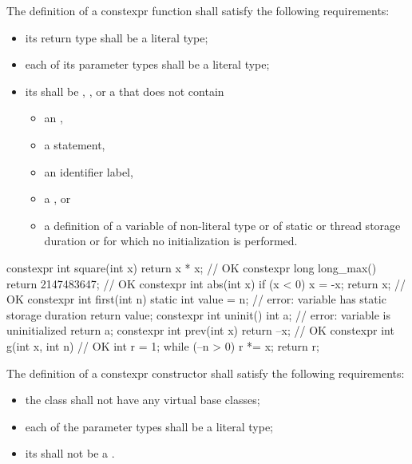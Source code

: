 \pnum
{}
The definition of a constexpr function shall satisfy the following
requirements:

\begin{itemize}
\item
its return type shall be a literal type;

\item
each of its parameter types shall be a literal type;

\item
its  shall be
, , or
a 
that does not contain

\begin{itemize}
\item an ,
\item a  statement,
\item an identifier label,
\item a , or
\item a definition of a variable
of non-literal type or
of static or thread storage duration or
for which no initialization is performed.
\end{itemize}

\end{itemize}

\begin{example}
\begin{codeblock}
constexpr int square(int x)
  { return x * x; }             // OK
constexpr long long_max()
  { return 2147483647; }        // OK
constexpr int abs(int x) {
  if (x < 0)
    x = -x;
  return x;                     // OK
}
constexpr int first(int n) {
  static int value = n;         // error: variable has static storage duration
  return value;
}
constexpr int uninit() {
  int a;                        // error: variable is uninitialized
  return a;
}
constexpr int prev(int x)
  { return --x; }               // OK
constexpr int g(int x, int n) { // OK
  int r = 1;
  while (--n > 0) r *= x;
  return r;
}
\end{codeblock}
\end{example}

\pnum
{}%
The definition of a constexpr constructor shall satisfy the
following requirements:
\begin{itemize}
\item
the class shall not have any virtual base classes;

\item
each of the parameter types shall be a literal type;

\item
its  shall not be a .
\end{itemize}

